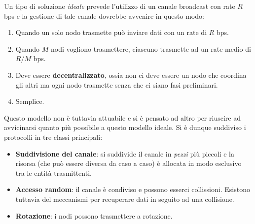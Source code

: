 Un tipo di soluzione \emph{ideale} prevede l'utilizzo di un canale 
broadcast con rate $R$ bps e la gestione di tale canale dovrebbe 
avvenire in questo modo:
\begin{enumerate}
	\item Quando un solo nodo trasmette può inviare dati con un rate 
		di $R$ bps.
	\item Quando $M$ nodi vogliono trasmettere, ciascuno trasmette ad
		un rate medio di $R / M$ bps.
	\item Deve essere \textbf{decentralizzato}, ossia non ci deve
		essere un nodo che coordina gli altri ma ogni nodo trasmette
		senza che ci siano fasi preliminari.
	\item Semplice.
\end{enumerate}
Questo modello non è tuttavia attuabile e si è pensato ad altro per
riuscire ad avvicinarsi quanto più possibile a questo modello ideale.
Si è dunque suddiviso i protocolli in tre classi principali:
\begin{itemize}
	\item \textbf{Suddivisione del canale}: si suddivide il canale
		in \emph{pezzi} più piccoli e la risorsa (che può essere 
		diversa da caso a caso) è allocata in modo esclusivo tra le
		entità trasmittenti.
	\item \textbf{Accesso random}: il canale è condiviso e possono 
		esserci collissioni. Esistono tuttavia del meccanismi per
		recuperare dati in seguito ad una collisione.
	\item \textbf{Rotazione}: i nodi possono trasmettere a rotazione.
\end{itemize}
